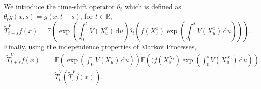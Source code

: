 \documentclass[a4paper,12pt,draft]{report}
\theoremstyle{remark}
\theoremstyle{definition}
\begin{document}
{\begin{align}
\end{align}
We introduce the time-shift operator $\theta_t$ which is defined as $\theta_tg(x, s) = g(x, t + s)$, for $t \in \mathbb{R}$,
$$
\tilde{T}_{t + s}^Vf(x) = \mathbb{E}\left(\exp\left(\int_0^t V(X_u^x)\,\mathrm{d}u\right)\theta_t\left(f(X_s^x)\exp\left(\int_0^s V(X_u^x)\,\mathrm{d}u\right)\right)\right).
$$
Finally, using the independence properties of Markov Processes,
\begin{align}
\tilde{T}_{t + s}^Vf(x) & = \mathbb{E}\left(\exp\left(\int_0^s V(X_u^x)\,\mathrm{d}u\right)\right)\mathbb{E}\left((f(X_s^{X_t})\exp\left(\int_0^s V(X_u^{X_t})\,\mathrm{d}u\right)\right)\nonumber\\
& = \tilde{T}_t^V(\tilde{T}_s^Vf(x)).\nonumber
\end{align}

\qedhere
}
\end{document}
